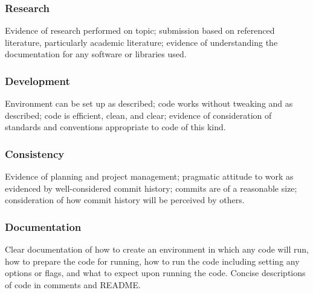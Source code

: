 \documentclass[a4paper, 12pt]{scrartcl}
\begin{document}
    \subsubsection*{Research}
    Evidence of research performed on topic; submission based on referenced literature, particularly academic literature; evidence of understanding the documentation for any software or libraries used.
    \subsubsection*{Development}
    Environment can be set up as described; code works without tweaking and as described; code is efficient, clean, and clear; evidence of consideration of standards and conventions appropriate to code of this kind.
    \subsubsection*{Consistency}
    Evidence of planning and project management; pragmatic attitude to work as evidenced by well-considered commit history; commits are of a reasonable size; consideration of how commit history will be perceived by others.
    \subsubsection*{Documentation}
    Clear documentation of how to create an environment in which any code will run, how to prepare the code for running, how to run the code including setting any options or flags, and what to expect upon running the code. Concise descriptions of code in comments and README.
    
  
  
  
\end{document}
